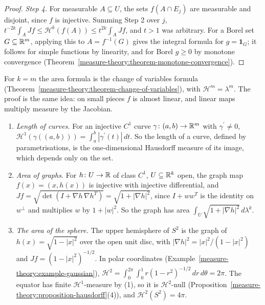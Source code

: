 \begin{proof}
\emph{Step 4.} For measurable $A \subseteq U$, the sets $f(A \cap E_j)$ are measurable and disjoint, since $f$ is injective. Summing Step 2 over $j$,
$t^{-2k}\int_AJf \leq \mathcal{H}^k(f(A)) \leq t^{2k}\int_AJf$, and $t > 1$ was arbitrary. For a Borel set $G \subseteq \mathbb{R}^m$, applying this to $A = f^{-1}(G)$ gives the integral formula for
$g = \mathbf{1}_G$; it follows for simple functions by linearity, and for Borel $g \geq 0$ by monotone convergence (Theorem~\ref{measure-theory:theorem-monotone-convergence}).
\end{proof}

For $k = m$ the area formula is the change of variables formula (Theorem~\ref{measure-theory:theorem-change-of-variables}), with $\mathcal{H}^m = \lambda^m$. The proof is the same idea: on small pieces
$f$ is almost linear, and linear maps multiply measure by the Jacobian.

\begin{example}\label{measure-theory:example-area-formula}
\begin{enumerate}
\item \emph{Length of curves.} For an injective $C^1$ curve $\gamma \colon (a, b) \to \mathbb{R}^m$ with $\gamma^{\prime} \neq 0$, $\mathcal{H}^1(\gamma((a, b))) = \int_a^b|\gamma^{\prime}(t)|\,dt$. So the length
of a curve, defined by parametrisations, is the one-dimensional Hausdorff measure of its image, which depends only on the set.
\item \emph{Area of graphs.} For $h \colon U \to \mathbb{R}$ of class $C^1$, $U \subseteq \mathbb{R}^k$ open, the graph map $f(x) = (x, h(x))$ is injective with injective differential, and
$Jf = \sqrt{\det(I + \nabla h\,\nabla h^T)} = \sqrt{1 + |\nabla h|^2}$, since $I + ww^T$ is the identity on $w^\perp$ and multiplies $w$ by $1 + |w|^2$. So the graph has area
$\int_U\sqrt{1 + |\nabla h|^2}\,d\lambda^k$.
\item \emph{The area of the sphere.} The upper hemisphere of $S^2$ is the graph of $h(x) = \sqrt{1 - |x|^2}$ over the open unit disc, with $|\nabla h|^2 = |x|^2/(1 - |x|^2)$ and
$Jf = (1 - |x|^2)^{-1/2}$. In polar coordinates (Example~\ref{measure-theory:example-gaussian}), $\mathcal{H}^2 = \int_0^{2\pi}\int_0^1 r(1 - r^2)^{-1/2}\,dr\,d\theta = 2\pi$. The equator has finite $\mathcal{H}^1$-measure by (1), so it is
$\mathcal{H}^2$-null (Proposition~\ref{measure-theory:proposition-hausdorff}(4)), and $\mathcal{H}^2(S^2) = 4\pi$.
\end{enumerate}
\end{example}

